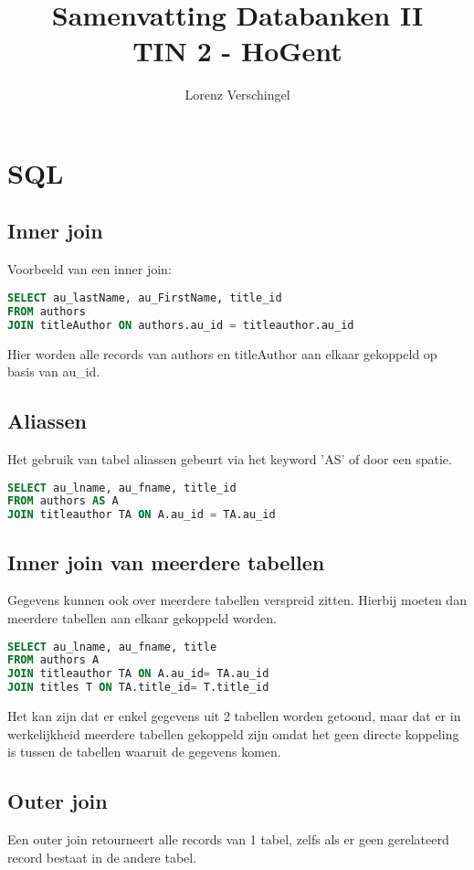 \documentclass[a4paper,12pt]{article}
\title{Samenvatting Databanken II \\ \large TIN 2 - HoGent}
\author{Lorenz Verschingel}
\begin{document}
\maketitle

\section{SQL}

\subsection{Inner join}
Voorbeeld van een inner join:
\begin{lstlisting}[language=sql]
SELECT au_lastName, au_FirstName, title_id
FROM authors
JOIN titleAuthor ON authors.au_id = titleauthor.au_id
\end{lstlisting}
Hier worden alle records van authors en titleAuthor aan elkaar gekoppeld op basis van au\_id.

\subsection{Aliassen}
Het gebruik van tabel aliassen gebeurt via het keyword 'AS' of door een spatie.

\begin{lstlisting}[language=sql]
SELECT au_lname, au_fname, title_id
FROM authors AS A
JOIN titleauthor TA ON A.au_id = TA.au_id
\end{lstlisting}

\subsection{Inner join van meerdere tabellen}
Gegevens kunnen ook over meerdere tabellen verspreid zitten. Hierbij moeten dan meerdere tabellen aan elkaar gekoppeld worden.
\begin{lstlisting}[language=sql]
SELECT au_lname, au_fname, title
FROM authors A
JOIN titleauthor TA ON A.au_id= TA.au_id
JOIN titles T ON TA.title_id= T.title_id
\end{lstlisting}
Het kan zijn dat er enkel gegevens uit 2 tabellen worden getoond, maar dat er in werkelijkheid meerdere tabellen gekoppeld zijn omdat het geen directe koppeling is tussen de tabellen waaruit de gegevens komen.

\subsection{Outer join}
Een outer join retourneert alle records van 1 tabel, zelfs als er geen gerelateerd record bestaat in de andere tabel.
\end{document}
